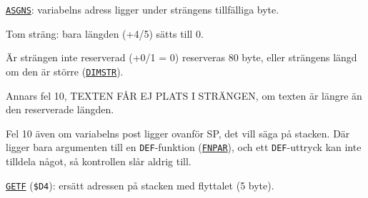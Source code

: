 \begin{Listing}
\begin{Note}
\par\noindent \hyperlink{l:ASGNS}{\texttt{ASGNS}}: variabelns adress ligger under strängens tillfälliga byte.\par
\begin{Punkter}
\item Tom sträng: bara längden (+4/5) sätts till 0.
\item Är strängen inte reserverad (+0/1 = 0) reserveras 80 byte, eller strängens längd om den är större (\hyperlink{l:DIMSTR}{\texttt{DIMSTR}}).
\item Annars fel 10, TEXTEN FÅR EJ PLATS I STRÄNGEN, om texten är längre än den reserverade längden.
\item Fel 10 även om variabelns post ligger ovanför SP, det vill säga på stacken. Där ligger bara argumenten till en \texttt{DEF}-funktion (\hyperlink{l:FNPAR}{\texttt{FNPAR}}), och ett \texttt{DEF}-uttryck kan inte tilldela något, så kontrollen slår aldrig till.
\end{Punkter}\end{Note}
\Gap
\begin{Cmt}\par\noindent \hyperlink{l:GETF}{\texttt{GETF}} (\texttt{\$D4}): ersätt adressen på stacken med flyttalet (5 byte).\par\end{Cmt}

\end{Listing}
